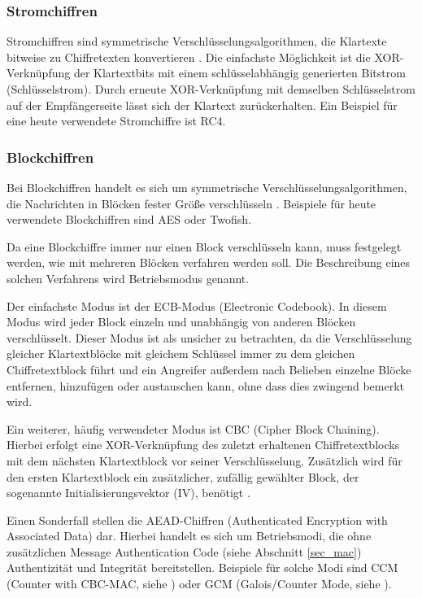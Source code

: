 \subsubsection{Stromchiffren}

Stromchiffren sind symmetrische Verschlüsselungsalgorithmen, die Klartexte bitweise zu Chiffretexten konvertieren \cite{Schneier2006}. Die einfachste Möglichkeit ist die XOR-Verknüpfung der Klartextbits mit einem schlüsselabhängig generierten Bitstrom (Schlüsselstrom). Durch erneute XOR-Verknüpfung mit demselben Schlüsselstrom auf der Empfängerseite lässt sich der Klartext zurückerhalten. Ein Beispiel für eine heute verwendete Stromchiffre ist RC4.

\subsubsection{Blockchiffren}

\label{sec_block_cipher}

Bei Blockchiffren handelt es sich um symmetrische Verschlüsselungsalgorithmen, die Nachrichten in Blöcken fester Größe verschlüsseln \cite{Schneier2006}. Beispiele für heute verwendete Blockchiffren sind AES oder Twofish.

Da eine Blockchiffre immer nur einen Block verschlüsseln kann, muss festgelegt werden, wie mit mehreren Blöcken verfahren werden soll. Die Beschreibung eines solchen Verfahrens wird Betriebsmodus genannt.

Der einfachste Modus ist der ECB-Modus (Electronic Codebook). In diesem Modus wird jeder Block einzeln und unabhängig von anderen Blöcken verschlüsselt. Dieser Modus ist als unsicher zu betrachten, da die Verschlüsselung gleicher Klartextblöcke mit gleichem Schlüssel immer zu dem gleichen Chiffretextblock führt und ein Angreifer außerdem nach Belieben einzelne Blöcke entfernen, hinzufügen oder austauschen kann, ohne dass dies zwingend bemerkt wird.

Ein weiterer, häufig verwendeter Modus ist CBC (Cipher Block Chaining). Hierbei erfolgt eine XOR-Verknüpfung des zuletzt erhaltenen Chiffretextblocks mit dem nächsten Klartextblock vor seiner Verschlüsselung. Zusätzlich wird für den ersten Klartextblock ein zusätzlicher, zufällig gewählter Block, der sogenannte Initialisierungsvektor (IV), benötigt \cite{Schneier2006}.

Einen Sonderfall stellen die AEAD-Chiffren (Authenticated Encryption with Associated Data) dar. Hierbei handelt es sich um Betriebsmodi, die ohne zusätzlichen Message Authentication Code (siehe Abschnitt \ref{sec_mac}) Authentizität und Integrität bereitstellen. Beispiele für solche Modi sind CCM (Counter with CBC-MAC, siehe \cite{whiting03}) oder GCM (Galois/Counter Mode, siehe \cite{mcgrew05}). 

